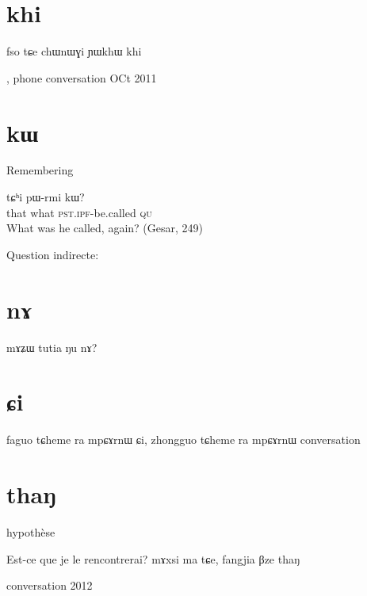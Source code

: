 \documentclass[oldfontcommands,oneside,a4paper,11pt]{memoir}
\newcommand{\ipa}[1]{{\phon #1}} %
\newcommand{\wav}[1]{}%
\newcommand{\ipf}{\textsc{ipf}}
\newcommand{\pst}{\textsc{pst}}
\begin{document}
\section{khi}

fso tɕe chɯnɯɣi ɲɯkhɯ khi

\wav{8_chWnWGi}, phone conversation OCt 2011


\section{kɯ}

Remembering
 \begin{exe}
\ex
\gll    \ipa{nɯnɯ} 	\ipa{tɕʰi} 	\ipa{pɯ-rmi} 	\ipa{kɯ?}       \\
that what \pst{}.\ipf{}-be.called \textsc{qu} \\
\glt  What was he called, again? (Gesar, 249)
\end{exe} 
 
 
 Question indirecte:

\section{nɤ}


mɤʑɯ tutia ŋu nɤ?


\section{ɕi}
faguo tɕheme ra mpɕɤrnɯ ɕi, zhongguo tɕheme ra mpɕɤrnɯ
conversation

\section{thaŋ}
hypothèse

Est-ce que je le rencontrerai?
mɤxsi ma tɕe, fangjia βze thaŋ
\wav{8_BzethaN}
conversation 2012
\tableofcontents


\end{document}
